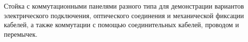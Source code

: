Стойка с коммутационными панелями разного типа для
демонстрации вариантов электрического подключения,
оптического соединения и механической фиксации кабелей, а
также коммутации с помощью соединительных кабелей, проводом и перемычек.
